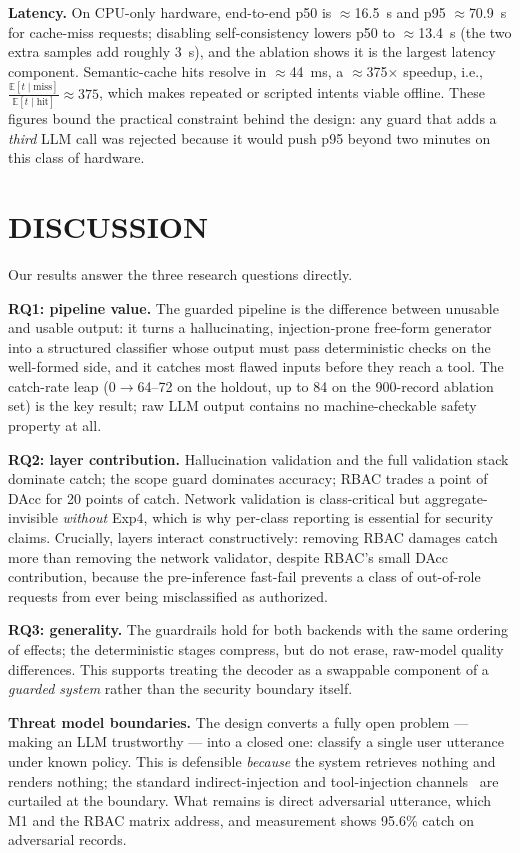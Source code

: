 \documentclass[conference]{IEEEtran}
\begin{document}
\textbf{Latency.} On CPU-only hardware, end-to-end p50 is $\approx$16.5~s and p95 $\approx$70.9~s for cache-miss requests; disabling self-consistency lowers p50 to $\approx$13.4~s (the two extra samples add roughly 3~s), and the ablation shows it is the largest latency component. Semantic-cache hits resolve in $\approx$44~ms, a $\approx$375$\times$ speedup, i.e.,\ $\tfrac{\mathbb{E}[t\mid\mathrm{miss}]}{\mathbb{E}[t\mid\mathrm{hit}]}\approx 375$, which makes repeated or scripted intents viable offline. These figures bound the practical constraint behind the design: any guard that adds a \emph{third} LLM call was rejected because it would push p95 beyond two minutes on this class of hardware.

\section{DISCUSSION}
Our results answer the three research questions directly.

\textbf{RQ1: pipeline value.} The guarded pipeline is the difference between unusable and usable output: it turns a hallucinating, injection-prone free-form generator into a structured classifier whose output must pass deterministic checks on the well-formed side, and it catches most flawed inputs before they reach a tool. The catch-rate leap (0$\rightarrow$64--72 on the holdout, up to 84 on the 900-record ablation set) is the key result; raw LLM output contains no machine-checkable safety property at all.

\textbf{RQ2: layer contribution.} Hallucination validation and the full validation stack dominate catch; the scope guard dominates accuracy; RBAC trades a point of DAcc for 20 points of catch. Network validation is class-critical but aggregate-invisible \emph{without} Exp4, which is why per-class reporting is essential for security claims. Crucially, layers interact constructively: removing RBAC damages catch more than removing the network validator, despite RBAC's small DAcc contribution, because the pre-inference fast-fail prevents a class of out-of-role requests from ever being misclassified as authorized.

\textbf{RQ3: generality.} The guardrails hold for both backends with the same ordering of effects; the deterministic stages compress, but do not erase, raw-model quality differences. This supports treating the decoder as a swappable component of a \emph{guarded system} rather than the security boundary itself.

\textbf{Threat model boundaries.} The design converts a fully open problem --- making an LLM trustworthy --- into a closed one: classify a single user utterance under known policy. This is defensible \emph{because} the system retrieves nothing and renders nothing; the standard indirect-injection and tool-injection channels~\cite{greshake2023indirect,owasp2025} are curtailed at the boundary. What remains is direct adversarial utterance, which M1 and the RBAC matrix address, and measurement shows 95.6\% catch on adversarial records.
\end{document}

